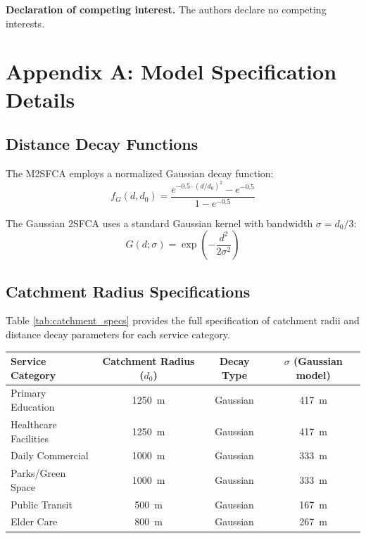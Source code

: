 \documentclass[preprint,12pt,authoryear]{elsarticle}
\begin{document}
\vskip 0.2in
\noindent\textbf{Declaration of competing interest.} The authors declare no competing interests.




\appendix
\section{Appendix A: Model Specification Details}
\label{appendix:model_spec}

\subsection{Distance Decay Functions}

The M2SFCA employs a normalized Gaussian decay function:
\begin{equation}
f_G(d, d_0) = \frac{e^{-0.5 \cdot (d/d_0)^2} - e^{-0.5}}{1 - e^{-0.5}}
\end{equation}

The Gaussian 2SFCA uses a standard Gaussian kernel with bandwidth $\sigma = d_0 / 3$:
\begin{equation}
G(d; \sigma) = \exp\left(-\frac{d^2}{2\sigma^2}\right)
\end{equation}

\subsection{Catchment Radius Specifications}

Table \ref{tab:catchment_specs} provides the full specification of catchment radii and distance decay parameters for each service category.

\begin{threeparttable}
\caption{Catchment Radius and Distance Decay Parameters by Service Category}
\label{tab:catchment_specs}
\begin{tabular}{lccc}
\toprule
Service Category & Catchment Radius ($d_0$) & Decay Type & $\sigma$ (Gaussian model) \\
\midrule
Primary Education & \SI{1250}{\meter} & Gaussian & \SI{417}{\meter} \\
Healthcare Facilities & \SI{1250}{\meter} & Gaussian & \SI{417}{\meter} \\
Daily Commercial & \SI{1000}{\meter} & Gaussian & \SI{333}{\meter} \\
Parks/Green Space & \SI{1000}{\meter} & Gaussian & \SI{333}{\meter} \\
Public Transit & \SI{500}{\meter} & Gaussian & \SI{167}{\meter} \\
Elder Care & \SI{800}{\meter} & Gaussian & \SI{267}{\meter} \\
\bottomrule
\end{tabular}
\end{threeparttable}
\end{document}
